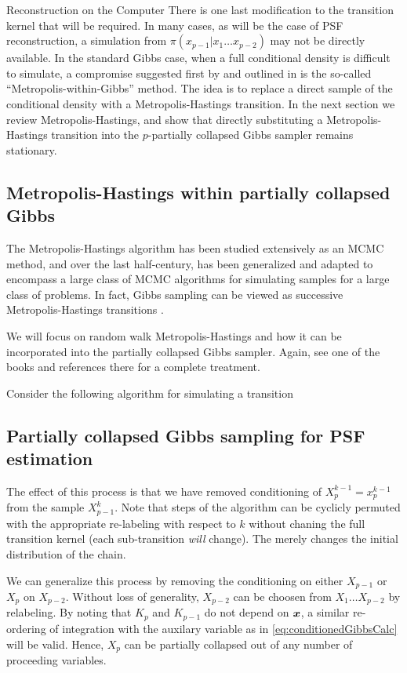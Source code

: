\begin{chapter}{Reconstruction on the Computer}
There is one last modification to the transition kernel that will be required.
In many cases, as will be the case of PSF reconstruction, a simulation from $\pi(x_{p-1}|x_1\dots x_{p-2})$ may not be directly available.
In the standard Gibbs case, when a full conditional density is difficult to simulate, a compromise suggested first by \citep{muller1992alternatives} and outlined in \citep{robert2013monte} is the so-called ``Metropolis-within-Gibbs'' method.
The idea is to replace a direct sample of the conditional density with a Metropolis-Hastings transition. 
In the next section we review Metropolis-Hastings, and show that directly substituting a Metropolis-Hastings transition into the $p$-partially collapsed Gibbs sampler remains stationary.

\subsection{Metropolis-Hastings within partially collapsed Gibbs}
The Metropolis-Hastings algorithm \citep{metropolis1953equation} has been studied extensively as an MCMC method, and over the last half-century, has been generalized and adapted to encompass a large class of MCMC algorithms for simulating samples for a large class of problems. 
In fact, Gibbs sampling can be viewed as successive Metropolis-Hastings transitions \citep{robert2013monte}.

We will focus on random walk Metropolis-Hastings and how it can be incorporated into the partially collapsed Gibbs sampler.
Again, see one of the books \citep{robert2013monte,liu2008monte} and references there for a complete treatment.

Consider the following algorithm for simulating a transition
\subsection{Partially collapsed Gibbs sampling for PSF estimation}
The effect of this process is that we have removed conditioning of $X_p^{k-1} = x_p^{k-1}$ from the sample $X^k_{p-1}$. 
Note that steps of the algorithm can be cyclicly permuted with the appropriate re-labeling with respect to $k$ without chaning the full transition kernel (each sub-transition \emph{will} change).
The merely changes the initial distribution of the chain.

We can generalize this process by removing the conditioning on either $X_{p-1}$ or $X_p$ on $X_{p-2}$.
Without loss of generality, $X_{p-2}$ can be choosen from $X_1\dots X_{p-2}$ by relabeling.
By noting that $K_p$ and $K_{p-1}$ do not depend on $\mbox{\boldmath$x$}$, a similar re-ordering of integration with the auxilary variable as in \eqref{eq:conditionedGibbsCalc} will be valid.
Hence, $X_p$ can be partially collapsed out of any number of proceeding variables.


\end{chapter}
